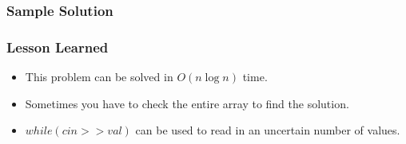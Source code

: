 \subsubsection{Sample Solution}

\subsubsection{Lesson Learned}
\begin{itemize}
	\item This problem can be solved in $O(n \log n)$ time.
	\item Sometimes you have to check the entire array to find the solution.
	\item $while(cin >> val)$ can be used to read in an uncertain number of values.
\end{itemize}
